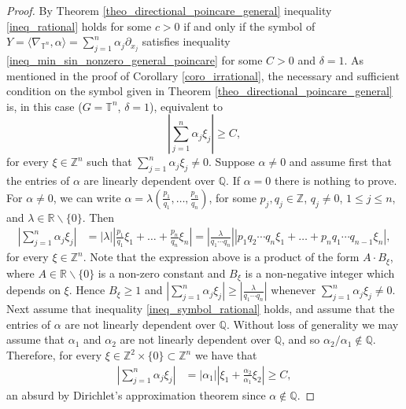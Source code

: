 \documentclass[11pt]{amsart}
\numberwithin{theorem}{section}
\numberwithin{equation}{section}
\theoremstyle{definition}
\numberwithin{example}{section}
\theoremstyle{definition}
\theoremstyle{definition}
\newcommand{\R}{\mathbb{R}}
\newcommand{\Z}{\mathbb{Z}}
\newcommand{\T}{\mathbb{T}}
\begin{document}
\begin{proof}
    By Theorem \ref{theo_directional_poincare_general} inequality \eqref{ineq_rational} holds for some $c>0$ if and only if the symbol of $Y=\langle \nabla_{\T^n},\alpha\rangle=\sum_{j=1}^n \alpha_j\partial_{x_j}$ satisfies inequality \eqref{ineq_min_sin_nonzero_general_poincare} for some $C>0$ and  $\delta=1$. 
    As mentioned in the proof of Corollary \eqref{coro_irrational}, the necessary and sufficient condition on the symbol given in Theorem \eqref{theo_directional_poincare_general} is, in this case ($G=\T^n$, $\delta=1$), equivalent to
    \begin{equation}\label{ineq_symbol_rational}
        \left|\sum_{j=1}^n \alpha_j\xi_j\right|\geq C,
    \end{equation}
     for every $\xi\in\Z^n$ such that $\sum_{j=1}^n \alpha_j\xi_j\neq 0$.  Suppose $\alpha\neq 0$ and assume first that the entries of $\alpha$ are linearly dependent over $\mathbb{Q}$. If $\alpha=0$ there is nothing to prove. For  $\alpha\neq 0$, we can write $\alpha=\lambda(\frac{p_1}{q_1},\dots,\frac{p_n}{q_n})$, for some  $p_j,q_j\in \Z$, $q_j\neq 0$, $1\leq j\leq n$, and $\lambda\in \R\backslash\{0\}$.
    Then
    \begin{align*}
         \left|\sum_{j=1}^n \alpha_j\xi_j\right|&=|\lambda|\left|\frac{p_1}{q_1}\xi_1+\dots+\frac{p_n}{q_n}\xi_n\right|=\left|\frac{\lambda}{q_1\cdots q_n}\right|\left|p_1q_2\cdots q_n\xi_1+\dots+p_nq_1\cdots q_{n-1} \xi_n\right|,
    \end{align*}
    for every $\xi\in\Z^n$. Note that the expression above is a product of the form $A\cdot B_\xi$, where $A\in \R\backslash\{0\}$ is a non-zero constant and $B_\xi$ is a non-negative integer which depends on $\xi$. Hence $B_\xi \geq 1$ and $ \left|\sum_{j=1}^n \alpha_j\xi_j\right|\geq \left|\frac{\lambda}{q_1\cdots q_n}\right|$ whenever $\sum_{j=1}^n \alpha_j\xi_j\neq 0$. Next assume that inequality \eqref{ineq_symbol_rational} holds, and assume that the entries of $\alpha$ are not linearly dependent over $\mathbb{Q}$. Without loss of generality we may assume that $\alpha_1$ and $\alpha_2$ are not linearly dependent over $\mathbb{Q}$, and so $\alpha_2/\alpha_1\not\in\mathbb{Q}$. Therefore, for every $\xi \in \Z^2\times \{0\}\subset \Z^n$ we have that
   \begin{align*}
       \left|\sum_{j=1}^n \alpha_j\xi_j\right|&=|\alpha_1|\left|\xi_1+\frac{\alpha_2}{\alpha_1}\xi_2\right|\geq C,
   \end{align*}
   an absurd by Dirichlet's approximation theorem since $\alpha\not\in\mathbb{Q}$.
\end{proof}
\end{document}
